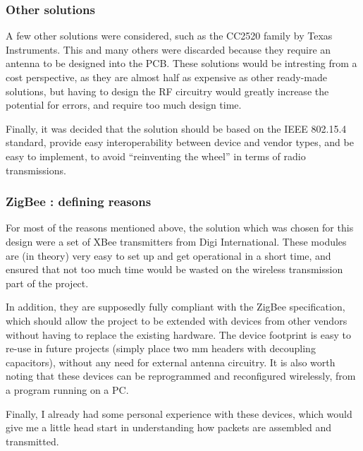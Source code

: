 \subsubsection{Other solutions}

A few other solutions were considered, such as the CC2520 family by Texas
Instruments. This and many others were discarded because
they require an antenna to be designed into the PCB. These solutions would be
intresting from a cost perspective, as they are almost half as expensive as
other ready-made solutions, but having to design the RF circuitry would greatly
increase the potential for errors, and require too much design time. 

Finally, it was decided that the solution should be based on the IEEE 802.15.4
standard, provide easy interoperability between device and vendor types, and be
easy to implement, to avoid ``reinventing the wheel'' in terms of radio
transmissions.

\subsubsection{ZigBee : defining reasons}
\label{sub:zigbee}

For most of the reasons mentioned above, the solution which was chosen for this
design were a set of XBee transmitters from Digi
International. These modules are (in theory) very easy to
set up and get operational in a short time, and ensured that not too much time
would be wasted on the wireless transmission part of the project.

In addition, they are supposedly fully compliant with the
ZigBee specification, which should allow the project to
be extended with devices from other vendors without having to replace the
existing hardware. The device footprint is easy to re-use in future projects
(simply place two \unit[2]{mm} headers with decoupling capacitors), without any
need for external antenna circuitry. It is also worth noting that these devices
can be reprogrammed and reconfigured wirelessly, from a program running on a PC.

Finally, I already had some personal experience with these devices, which would
give me a little head start in understanding how packets are assembled and
transmitted.


